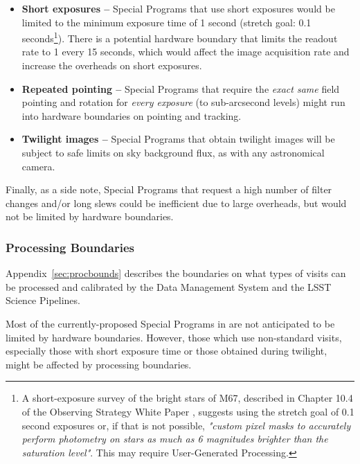 \begin{itemize}

\item \textbf{Short exposures --}
Special Programs that use short exposures would be limited to the
minimum exposure time of 1 second (stretch goal: 0.1 seconds\footnote{A short-exposure survey 
of the bright stars of M67, described in Chapter 10.4 of the 
Observing Strategy White Paper \citep{2017arXiv170804058L}, suggests using the stretch goal of 
0.1 second exposures or, if that is not possible, \textit{"custom pixel masks to accurately perform 
photometry on stars as much as 6 magnitudes brighter than the saturation level"}. 
This may require User-Generated Processing.}).
There is a potential hardware boundary that limits the readout rate to 1 
every 15 seconds, which would affect the image acquisition rate and 
increase the overheads on short exposures.

\item \textbf{Repeated pointing --}
Special Programs that require the \emph{exact same} field pointing and 
rotation for \emph{every exposure} (to sub-arcsecond levels) might run 
into hardware boundaries on pointing and tracking.

\item \textbf{Twilight images --}
Special Programs that obtain twilight images will be subject to safe
limits on sky background flux, as with any astronomical camera.

\end{itemize}

Finally, as a side note, Special Programs that request a high number of 
filter changes and/or long slews could be inefficient due to large overheads,
but would not be limited by hardware boundaries.

\subsubsection{Processing Boundaries}\label{ssec:proc_bounds_processing}

Appendix~\ref{sec:procbounds} describes the boundaries on what types of visits 
can be processed and calibrated by the Data Management System and the LSST
Science Pipelines.

Most of the currently-proposed Special Programs in 
are not anticipated to be limited by hardware boundaries.
However, those which use non-standard visits, especially those with
short exposure time or those obtained during twilight, might
be affected by processing boundaries.

